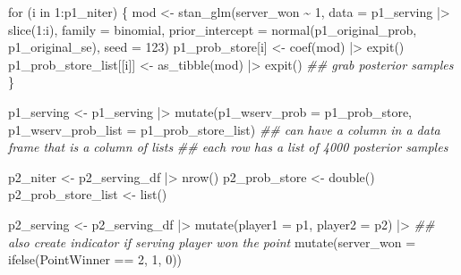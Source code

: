 \documentclass[
  letterpaper,
  DIV=11,
  numbers=noendperiod]{scrartcl}
\newenvironment{Shaded}{\begin{snugshade}}{\end{snugshade}}
\newcommand{\AttributeTok}[1]{\textcolor[rgb]{0.40,0.45,0.13}{#1}}
\newcommand{\ControlFlowTok}[1]{\textcolor[rgb]{0.00,0.23,0.31}{#1}}
\newcommand{\DecValTok}[1]{\textcolor[rgb]{0.68,0.00,0.00}{#1}}
\newcommand{\DocumentationTok}[1]{\textcolor[rgb]{0.37,0.37,0.37}{\textit{#1}}}
\newcommand{\FunctionTok}[1]{\textcolor[rgb]{0.28,0.35,0.67}{#1}}
\newcommand{\NormalTok}[1]{\textcolor[rgb]{0.00,0.23,0.31}{#1}}
\newcommand{\OtherTok}[1]{\textcolor[rgb]{0.00,0.23,0.31}{#1}}
\newcommand{\SpecialCharTok}[1]{\textcolor[rgb]{0.37,0.37,0.37}{#1}}
\begin{document}
\begin{Shaded}
\begin{Highlighting}[]
  \ControlFlowTok{for}\NormalTok{ (i }\ControlFlowTok{in} \DecValTok{1}\SpecialCharTok{:}\NormalTok{p1\_niter) \{}
\NormalTok{    mod }\OtherTok{\textless{}{-}} \FunctionTok{stan\_glm}\NormalTok{(server\_won }\SpecialCharTok{\textasciitilde{}} \DecValTok{1}\NormalTok{, }\AttributeTok{data =}\NormalTok{ p1\_serving }\SpecialCharTok{|\textgreater{}} \FunctionTok{slice}\NormalTok{(}\DecValTok{1}\SpecialCharTok{:}\NormalTok{i),}
                    \AttributeTok{family =}\NormalTok{ binomial,}
                    \AttributeTok{prior\_intercept =} \FunctionTok{normal}\NormalTok{(p1\_original\_prob, p1\_original\_se),}
                    \AttributeTok{seed =} \DecValTok{123}\NormalTok{)}
\NormalTok{    p1\_prob\_store[i] }\OtherTok{\textless{}{-}} \FunctionTok{coef}\NormalTok{(mod) }\SpecialCharTok{|\textgreater{}} \FunctionTok{expit}\NormalTok{()}
\NormalTok{    p1\_prob\_store\_list[[i]] }\OtherTok{\textless{}{-}} \FunctionTok{as\_tibble}\NormalTok{(mod) }\SpecialCharTok{|\textgreater{}} \FunctionTok{expit}\NormalTok{() }\DocumentationTok{\#\# grab posterior samples}
\NormalTok{  \}}
  
\NormalTok{  p1\_serving }\OtherTok{\textless{}{-}}\NormalTok{ p1\_serving }\SpecialCharTok{|\textgreater{}}
    \FunctionTok{mutate}\NormalTok{(}\AttributeTok{p1\_wserv\_prob =}\NormalTok{ p1\_prob\_store,}
           \AttributeTok{p1\_wserv\_prob\_list =}\NormalTok{ p1\_prob\_store\_list)}
  \DocumentationTok{\#\# can have a column in a data frame that is a column of lists}
  \DocumentationTok{\#\# each row has a list of 4000 posterior samples}
  
\NormalTok{  p2\_niter }\OtherTok{\textless{}{-}}\NormalTok{ p2\_serving\_df }\SpecialCharTok{|\textgreater{}} \FunctionTok{nrow}\NormalTok{()}
\NormalTok{  p2\_prob\_store }\OtherTok{\textless{}{-}} \FunctionTok{double}\NormalTok{()}
\NormalTok{  p2\_prob\_store\_list }\OtherTok{\textless{}{-}} \FunctionTok{list}\NormalTok{()}
  
\NormalTok{  p2\_serving }\OtherTok{\textless{}{-}}\NormalTok{ p2\_serving\_df }\SpecialCharTok{|\textgreater{}}
    \FunctionTok{mutate}\NormalTok{(}\AttributeTok{player1 =}\NormalTok{ p1,}
           \AttributeTok{player2 =}\NormalTok{ p2) }\SpecialCharTok{|\textgreater{}}
    \DocumentationTok{\#\# also create indicator if serving player won the point}
    \FunctionTok{mutate}\NormalTok{(}\AttributeTok{server\_won =} \FunctionTok{ifelse}\NormalTok{(PointWinner }\SpecialCharTok{==} \DecValTok{2}\NormalTok{, }\DecValTok{1}\NormalTok{, }\DecValTok{0}\NormalTok{))}
  

\end{Highlighting}
\end{Shaded}
\end{document}
